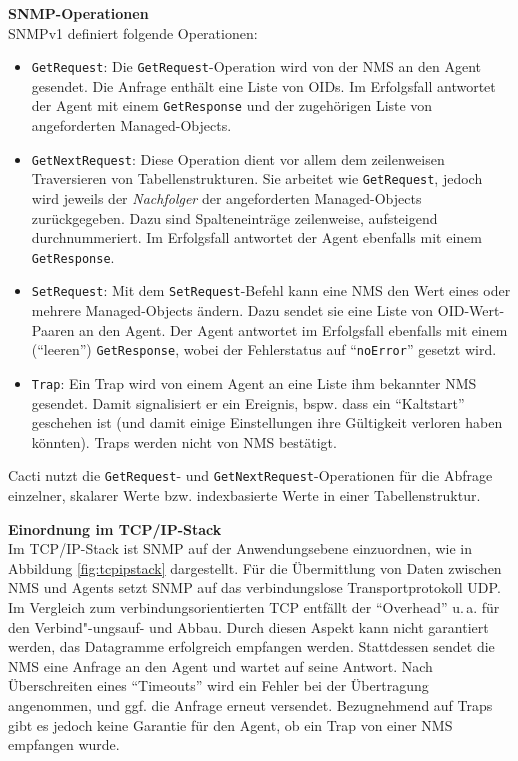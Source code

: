 \documentclass[12pt,ngerman,toc=listofnumbered,toc=bibliographynumbered,toc=index,headsepline=true]{scrbook}
\begin{document}
\textbf{SNMP-Operationen}\\[1ex]
SNMPv1 definiert folgende Operationen:
\begin{itemize}
  \item \texttt{GetRequest}: Die \texttt{GetRequest}-Operation wird von der NMS
  an den Agent gesendet. Die Anfrage enthält eine Liste von OIDs. Im Erfolgsfall
  antwortet der Agent mit einem \texttt{GetResponse} und der zugehörigen Liste
  von angeforderten Managed-Objects.
  \item \texttt{GetNextRequest}: Diese Operation dient vor allem dem
  zeilenweisen Traversieren von Tabellenstrukturen. Sie arbeitet wie
  \texttt{GetRequest}, jedoch wird jeweils der \textit{Nachfolger} der
  angeforderten Managed-Objects zurückgegeben. Dazu sind Spalteneinträge
  zeilenweise, aufsteigend durchnummeriert. Im Erfolgsfall antwortet der Agent
  ebenfalls mit einem \texttt{GetResponse}.
  \item \texttt{SetRequest}: Mit dem \texttt{SetRequest}-Befehl kann eine NMS
  den Wert eines oder mehrere Managed-Objects ändern. Dazu sendet sie eine Liste
  von OID-Wert-Paaren an den Agent. Der Agent antwortet im Erfolgsfall ebenfalls
  mit einem (\enquote{leeren}) \texttt{GetResponse}, wobei der Fehlerstatus auf
  \enquote{\texttt{noError}} gesetzt wird.
  \item \texttt{Trap}: Ein Trap wird von einem Agent an eine Liste ihm bekannter
  NMS gesendet. Damit signalisiert er ein Ereignis, bspw. dass ein
  \enquote{Kaltstart} geschehen ist (und damit einige Einstellungen ihre
  Gültigkeit verloren haben könnten). Traps werden nicht von NMS bestätigt.
\end{itemize}
Cacti nutzt die \texttt{GetRequest}- und \texttt{GetNextRequest}-Operationen für
die Abfrage einzelner, skalarer Werte bzw. indexbasierte Werte in einer
Tabellenstruktur.

\textbf{Einordnung im TCP/IP-Stack}\\[1ex]
Im TCP/IP-Stack ist SNMP auf der Anwendungsebene einzuordnen, wie in Abbildung
\ref{fig:tcpipstack} dargestellt. Für die Übermittlung von Daten zwischen NMS
und Agents setzt SNMP auf das verbindungslose Transportprotokoll UDP. Im
Vergleich zum verbindungsorientierten TCP entfällt der \enquote{Overhead} u.\,a.
für den Verbind"-ungsauf- und Abbau. Durch diesen Aspekt kann nicht garantiert
werden, das Datagramme erfolgreich empfangen werden. Stattdessen sendet die NMS
eine Anfrage an den Agent und wartet auf seine Antwort. Nach Überschreiten eines
\enquote{Timeouts} wird ein Fehler bei der Übertragung angenommen, und ggf. die
Anfrage erneut versendet. Bezugnehmend auf Traps gibt es jedoch keine Garantie
für den Agent, ob ein Trap von einer NMS empfangen wurde.
\end{document}
